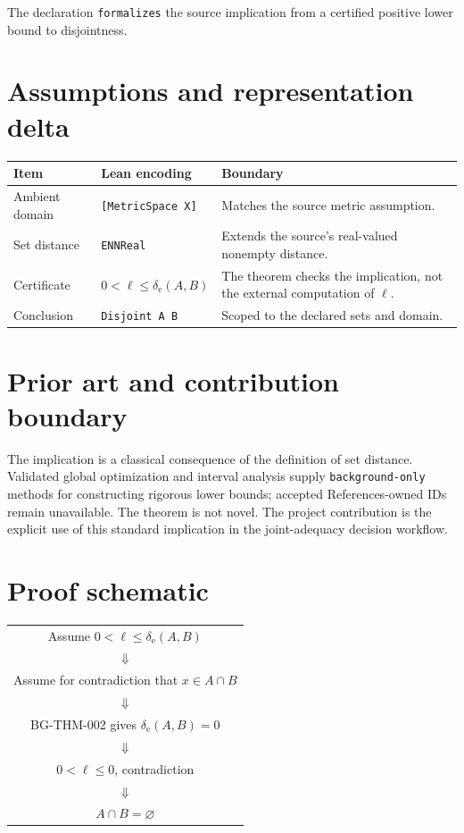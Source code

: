\documentclass[11pt]{article}
\begin{document}
The declaration \texttt{formalizes} the source implication from a certified positive
lower bound to disjointness.

\section{Assumptions and representation delta}

\begin{tabularx}{\textwidth}{@{}l>{\raggedright\arraybackslash}X>{\raggedright\arraybackslash}X@{}}
\toprule
Item & Lean encoding & Boundary \\
\midrule
Ambient domain & \texttt{[MetricSpace X]} & Matches the source metric assumption. \\
Set distance & \texttt{ENNReal} & Extends the source's real-valued nonempty distance. \\
Certificate & $0<\ell\le\delta_{\mathrm e}(A,B)$ & The theorem checks the implication, not the external computation of $\ell$. \\
Conclusion & \texttt{Disjoint A B} & Scoped to the declared sets and domain. \\
\bottomrule
\end{tabularx}

\section{Prior art and contribution boundary}

The implication is a classical consequence of the definition of set distance. Validated
global optimization and interval analysis supply \texttt{background-only} methods for
constructing rigorous lower bounds; accepted References-owned IDs remain unavailable.
The theorem is not novel. The project contribution is the explicit use of this standard
implication in the joint-adequacy decision workflow.

\section{Proof schematic}

\begin{center}
\begin{tabular}{c}
Assume $0<\ell\le\delta_{\mathrm e}(A,B)$ \\
$\Downarrow$ \\
Assume for contradiction that $x\in A\cap B$ \\
$\Downarrow$ \\
BG-THM-002 gives $\delta_{\mathrm e}(A,B)=0$ \\
$\Downarrow$ \\
$0<\ell\le0$, contradiction \\
$\Downarrow$ \\
$A\cap B=\varnothing$
\end{tabular}
\end{center}
\end{document}
